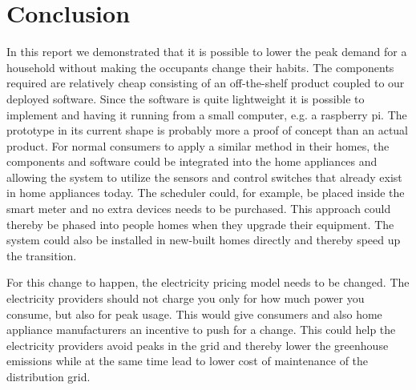 \section{Conclusion}
\label{sec:conclusion}
In this report we demonstrated that it is possible to lower the peak demand for a household without making the occupants change their habits. The components required are relatively cheap consisting of an off-the-shelf product coupled to our deployed software. Since the software is quite lightweight it is possible to implement and having it running from a small computer, e.g. a raspberry pi. The prototype in its current shape is probably more a proof of concept than an actual product. For normal consumers to apply a similar method in their homes, the components and software could be integrated into the home appliances and allowing the system to utilize the sensors and control switches that already exist in home appliances today. The scheduler could, for example, be placed inside the smart meter and no extra devices needs to be purchased. This approach could thereby be phased into people homes when they upgrade their equipment. The system could also be installed in new-built homes directly and thereby speed up the transition.

For this change to happen, the electricity pricing model needs to be changed. The electricity providers should not charge you only for how much power you consume, but also for peak usage. This would give consumers and also home appliance manufacturers an incentive to push for a change. This could help the electricity providers avoid peaks in the grid and thereby lower the greenhouse emissions while at the same time lead to lower cost of maintenance of the distribution grid.

